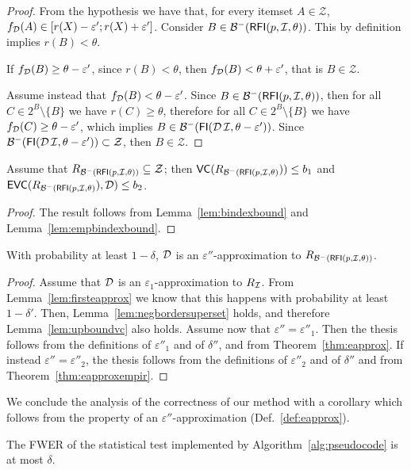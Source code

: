\begin{proof}
From the hypothesis we have that, for every itemset $A\in\mathcal{Z}$,
$f_{{\cal D}}(A) \in [r(X) - \varepsilon'; r(X)+\varepsilon']$. Consider
$B\in\mathcal{B}^-(\mathsf{RFI}(p,{\cal I},\theta))$. This by definition implies
$r(B)<\theta$. 

If $f_{\cal D}(B) \ge \theta - \varepsilon'$, since $r(B) < \theta$,
then $f_{\cal D}(B) < \theta + \varepsilon'$, that is $B \in\mathcal{Z}$.

Assume instead that $f_{\cal D}(B) < \theta - \varepsilon'$. Since $B \in
\mathcal{B}^-(\mathsf{RFI}(p,{\cal I},\theta))$, then for all $C \in
2^B\setminus\{B\}$ we have $r(C) \ge \theta$, therefore for all $C \in
2^B\setminus\{B\}$ we have $f_{\cal D}(C) \ge \theta - \varepsilon'$, which implies $B \in
\mathcal{B}^-(\mathsf{FI}({\cal D}\,{\cal I},\theta-\varepsilon'))$. Since
$\mathcal{B}^-(\mathsf{FI}({\cal D}\,{\cal I},\theta-\varepsilon'))\subset\mathcal{Z}$, then
$B\in\mathcal{Z}$.
\end{proof}

\begin{lemma}\label{lem:upboundvc}
  Assume that $R_{\mathcal{B}^-(\mathsf{RFI}(p,{\cal I},\theta))}\subseteq\mathcal{Z}$; then
  $\mathsf{VC}(R_{\mathcal{B}^-(\mathsf{RFI}(p,{\cal I},\theta)}))\le b_1$ and
  $\mathsf{EVC}(R_{\mathcal{B}^-(\mathsf{RFI}(p,{\cal I},\theta)}),{\cal D})\le b_2$.
\end{lemma}

\begin{proof}
  The result follows from Lemma~\ref{lem:bindexbound} and
  Lemma~\ref{lem:empbindexbound}.
\end{proof}

\begin{lemma}\label{len:secondeapprox}
  With probability at least $1-\delta$, ${\cal D}$ is an
  $\varepsilon''$-approximation to $R_{\mathcal{B}^-(\mathsf{RFI}(p,{\cal I},\theta))}$.
\end{lemma}

\begin{proof}
  Assume that ${\cal D}$ is an $\varepsilon_1$-approximation to $R_{\cal I}$.
  From Lemma~\ref{lem:firsteapprox} we know that this happens with probability
  at least $1-\delta'$. Then, Lemma~\ref{lem:negbordersuperset} holds, and
  therefore Lemma~\ref{lem:upboundvc} also holds. Assume now that
  $\varepsilon''=\varepsilon''_1$. Then the thesis follows from the
  definitions of $\varepsilon''_1$ and of $\delta''$, and from
  Theorem~\ref{thm:eapprox}. If instead $\varepsilon''=\varepsilon''_2$, the thesis follows
  from the definitions of $\varepsilon''_2$ and of $\delta''$ and from
  Theorem~\ref{thm:eapproxempir}.
\end{proof}
  
We conclude the analysis of the correctness of our method with a corollary which
follows from the property of an $\varepsilon''$-approximation
(Def.~\ref{def:eapprox}).
\begin{corollary}
  The FWER of the statistical test implemented by Algorithm~\ref{alg:pseudocode} is at most $\delta$.
\end{corollary}


